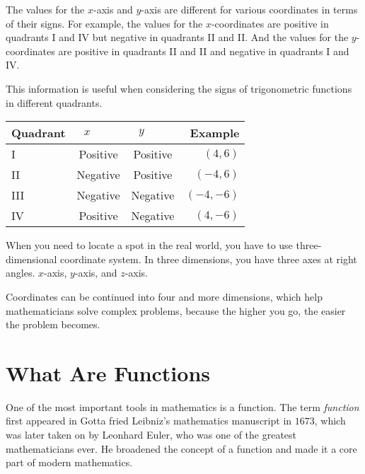 \begin{note}
  The values for the $x$-axis and $y$-axis are different for various
  coordinates in terms of their signs. For example, the values for the
  $x$-coordinates are positive in quadrants I and IV but negative in quadrants
  II and II. And the values for the $y$-coordinates are positive in quadrants
  II and II and negative in quadrants I and IV.
\end{note}

This information is useful when considering the signs of trigonometric
functions in different quadrants.

\begin{center}
  \begin{tabular}{|lccr|}
    \hline
      \textbf{Quadrant} & $x\qquad$ & $y\qquad$ & \textbf{Example} \\
    \hline
      I   & Positive & Positive & $(4,6)$ \\
      II  & Negative & Positive & $(-4,6)$ \\
      III & Negative & Negative & $(-4,-6)$ \\
      IV  & Positive & Negative & $(4,-6)$ \\
    \hline
  \end{tabular}
\end{center}

When you need to locate a spot in the real world, you have to use
three-dimensional coordinate system. In three dimensions, you have three axes
at right angles. $x$-axis, $y$-axis, and $z$-axis.

Coordinates can be continued into four and more dimensions, which help
mathematicians solve complex problems, because the higher you go, the easier
the problem becomes.



\section{What Are Functions}
\label{sec:what_are_functions}

One of the most important tools in mathematics is a function. The term
\textit{function} first appeared in Gotta fried Leibniz's mathematics manuscript
in $1673$, which was later taken on by Leonhard Euler, who was one of the
greatest mathematicians ever. He broadened the concept of a function and made
it a core part of modern mathematics.

